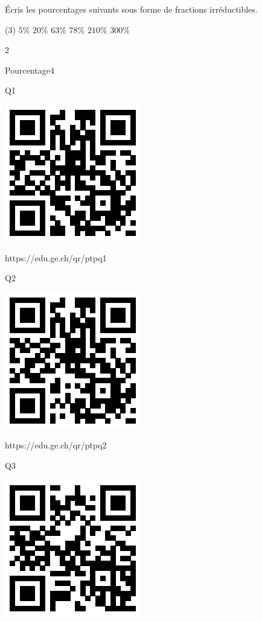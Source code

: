 \documentclass[a4paper,11pt]{report}
\begin{document}
\begin{exo}{
Écris les pourcentages suivants sous forme de fractions irréductibles.
\begin{tasks}(3)
\task $5\%$
\task $20\%$
\task $63\%$
\task $78\%$
\task $210\%$
\task $300\%$
\end{tasks}
 \vspace{1pt}
}{2}\end{exo}

\begin{qmoodle}{Pourcentage}{4}{
	\begin{center}	
		Q1

\includegraphics[scale=1]{media/qr/ptpq1}

\tiny{{https://edu.ge.ch/qr/ptpq1}}
\end{center}
	\begin{center}	
		Q2

\includegraphics[scale=1]{media/qr/ptpq2}

\tiny{{https://edu.ge.ch/qr/ptpq2}}
\end{center}
	\begin{center}	
		Q3

\includegraphics[scale=1]{media/qr/ptpq3}


\end{center}}
\end{qmoodle}
\end{document}
